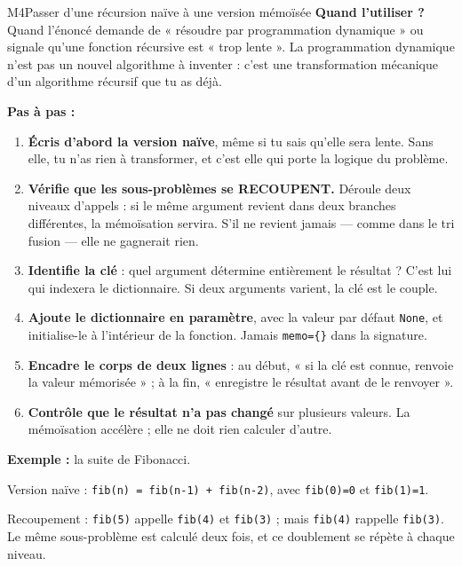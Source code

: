 \begin{fichemethode}{M4}{Passer d'une récursion naïve à une version mémoïsée}
\textbf{Quand l'utiliser ?} Quand l'énoncé demande de « résoudre par programmation dynamique »
ou signale qu'une fonction récursive est « trop lente ». La programmation dynamique n'est pas
un nouvel algorithme à inventer : c'est une transformation mécanique d'un algorithme récursif
que tu as déjà.

\textbf{Pas à pas :}
\begin{enumerate}
  \item \textbf{Écris d'abord la version naïve}, même si tu sais qu'elle sera lente. Sans
    elle, tu n'as rien à transformer, et c'est elle qui porte la logique du problème.
  \item \textbf{Vérifie que les sous-problèmes se RECOUPENT.} Déroule deux niveaux d'appels :
    si le même argument revient dans deux branches différentes, la mémoïsation servira. S'il
    ne revient jamais — comme dans le tri fusion — elle ne gagnerait rien.
  \item \textbf{Identifie la clé} : quel argument détermine entièrement le résultat ? C'est
    lui qui indexera le dictionnaire. Si deux arguments varient, la clé est le couple.
  \item \textbf{Ajoute le dictionnaire en paramètre}, avec la valeur par défaut
    \lstinline{None}, et initialise-le à l'intérieur de la fonction. Jamais
    \lstinline!memo={}! dans la signature.
  \item \textbf{Encadre le corps de deux lignes} : au début, « si la clé est connue, renvoie
    la valeur mémorisée » ; à la fin, « enregistre le résultat avant de le renvoyer ».
  \item \textbf{Contrôle que le résultat n'a pas changé} sur plusieurs valeurs. La mémoïsation
    accélère ; elle ne doit rien calculer d'autre.
\end{enumerate}

\textbf{Exemple :} la suite de Fibonacci.

Version naïve : \lstinline{fib(n) = fib(n-1) + fib(n-2)}, avec \lstinline{fib(0)=0} et
\lstinline{fib(1)=1}.

Recoupement : \lstinline{fib(5)} appelle \lstinline{fib(4)} et \lstinline{fib(3)} ; mais
\lstinline{fib(4)} rappelle \lstinline{fib(3)}. Le même sous-problème est calculé deux fois,
et ce doublement se répète à chaque niveau.


\end{fichemethode}
